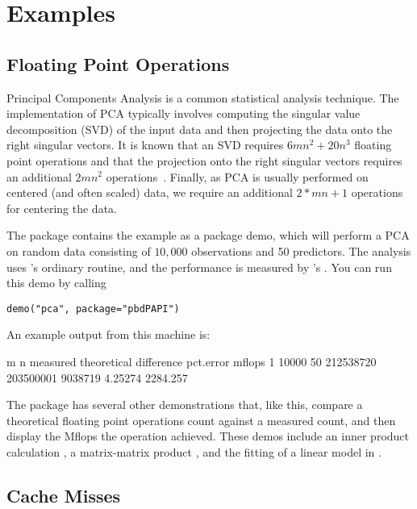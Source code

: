 \section{Examples}


\subsection{Floating Point Operations}

Principal Components Analysis is a common statistical analysis technique.  The 
implementation of PCA typically involves computing the singular value 
decomposition (SVD) of the input data and then projecting the data onto the 
right singular vectors.  It is known that an SVD requires $6mn^2 + 20n^3$ 
floating point operations and that the projection onto the right singular 
vectors requires an additional $2mn^2$ operations~\citep{gvl}.  Finally, as PCA 
is usually performed on centered (and often scaled) data, we require an 
additional $2*mn+1$ operations for centering the data.

The \thispackage package contains the example  as a package demo, 
which will perform a PCA on random data consisting of $10,000$ observations and 
50 predictors.  The analysis uses \R's ordinary  routine, and 
the performance is measured by \thispackage's .  You can 
run this demo by calling

\begin{lstlisting}[language=rr]
demo("pca", package="pbdPAPI")
\end{lstlisting}


An example output from this machine is:

\begin{Output}
      m  n  measured theoretical difference pct.error   mflops
1 10000 50 212538720   203500001    9038719   4.25274 2284.257
\end{Output}

The \thispackage package has several other demonstrations that, like this, 
compare a theoretical floating point operations count against a measured count, 
and then display the Mflops the operation achieved.  These demos include 
an inner product calculation , a matrix-matrix product 
, and the fitting of a linear model in .


\subsection{Cache Misses}


